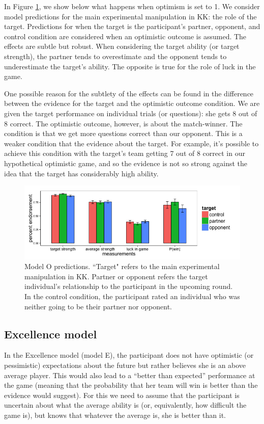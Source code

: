 \documentclass{article}
\begin{document}
In Figure \ref{fig:modelo}, we show below what happens when optimism is set to 1. We consider model predictions for the main experimental manipulation in KK: the role of the target. Predictions for when the target is the participant's partner, opponent, and control condition are considered when an optimistic outcome is assumed. The effects are subtle but robust. When considering the target ability (or target strength), the partner tends to overestimate and the opponent tends to underestimate the target's ability. The opposite is true for the role of luck in the game. 

One possible reason for the subtlety of the effects can be found in the difference between the evidence for the target and the optimistic outcome condition. We are given the target performance on individual trials (or questions): she gets 8 out of 8 correct. The optimistic outcome, however, is about the match-winner. The condition is that we get more questions correct than our opponent. This is a weaker condition that the evidence about the target. For example, it's possible to achieve this condition with the target's team getting 7 out of 8 correct in our hypothetical optimistic game, and so the evidence is not so strong against the idea that the target has considerably high ability. 

\begin{figure}
\centering
    \includegraphics[width=\columnwidth]{modelO-predictions}
    \caption{Model O predictions. ``Target" refers to the main experimental manipulation in KK. Partner or opponent refers the target individual's relationship to the participant in the upcoming round. In the control condition, the participant rated an individual who was neither going to be their partner nor opponent.}
      \label{fig:modelo}
\end{figure}


\subsection{Excellence model}
In the Excellence model (model E), the participant does not have optimistic (or pessimistic) expectations about the future but rather believes she is an above average player. This would also lead to a ``better than expected'' performance at the game (meaning that the probability that her team will win is better than the evidence would suggest). For this we need to assume that the participant is uncertain about what the average ability is (or, equivalently, how difficult the game is), but knows that whatever the average is, she is better than it.
\end{document}

